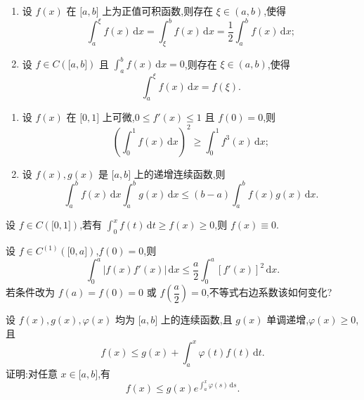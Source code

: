 \documentclass[../数学分析培优讲义.tex]{subfiles}
\begin{document}
\begin{example}
\begin{enumerate}[label=(\arabic*)]
    \item 设 $f(x)$ 在 $\lbrack a,b\rbrack$ 上为正值可积函数,则存在 $\xi\in(a,b)$,使得
    \[
        \int_a^\xi f(x)\,\mathrm{d}x
        =\int_\xi^b f(x)\,\mathrm{d}x
        =\dfrac{1}{2}\int_a^b f(x)\,\mathrm{d}x;
    \]
    \item 设 $f\in C(\lbrack a,b\rbrack)$ 且 $\displaystyle\int_a^b f(x)\,\mathrm{d}x=0$,则存在 $\xi\in(a,b)$,使得
    \[
        \int_a^\xi f(x)\,\mathrm{d}x=f(\xi).
    \]
\end{enumerate}
\end{example}
\exampleblank

\begin{example}
\begin{enumerate}[label=(\arabic*)]
    \item 设 $f(x)$ 在 $\lbrack 0,1\rbrack$ 上可微,$0\leq f'(x)\leq1$ 且 $f(0)=0$,则
    \[
        \left(\int_0^1f(x)\,\mathrm{d}x\right)^2
        \geq\int_0^1f^3(x)\,\mathrm{d}x;
    \]
    \item 设 $f(x),g(x)$ 是 $\lbrack a,b\rbrack$ 上的递增连续函数,则
    \[
        \int_a^bf(x)\,\mathrm{d}x\int_a^bg(x)\,\mathrm{d}x
        \leq(b-a)\int_a^bf(x)g(x)\,\mathrm{d}x.
    \]
\end{enumerate}
\end{example}
\exampleblank

\begin{example}
设 $f\in C(\lbrack 0,1\rbrack)$,若有 $\displaystyle\int_0^x f(t)\,\mathrm{d}t\geq f(x)\geq0$,则 $f(x)\equiv0$.
\end{example}
\exampleblank

\begin{example}
设 $f\in C^{(1)}(\lbrack 0,a\rbrack)$,$f(0)=0$,则
\[
    \int_0^a|f(x)f'(x)|\,\mathrm{d}x
    \leq\dfrac{a}{2}\int_0^a[f'(x)]^2\,\mathrm{d}x.
\]
若条件改为 $f(a)=f(0)=0$ 或 $f\left(\dfrac{a}{2}\right)=0$,不等式右边系数该如何变化?
\end{example}
\exampleblank

\begin{example}[Gronwall 引理]
设 $f(x),g(x),\varphi(x)$ 均为 $\lbrack a,b\rbrack$ 上的连续函数,且 $g(x)$ 单调递增,$\varphi(x)\geq0$,且
\[
    f(x)\leq g(x)+\int_a^x\varphi(t)f(t)\,\mathrm{d}t.
\]
证明:对任意 $x\in\lbrack a,b\rbrack$,有
\[
    f(x)\leq g(x)e^{\int_a^x\varphi(s)\,\mathrm{d}s}.
\]
\end{example}
\exampleblank
\end{document}
